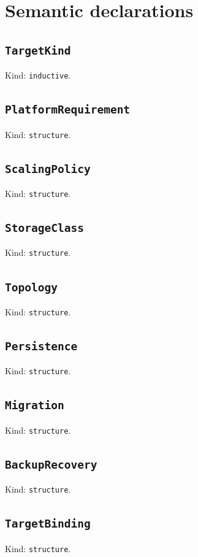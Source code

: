 \documentclass[11pt]{article}
\begin{document}
\section*{Semantic declarations}
\subsection*{\texttt{TargetKind}}
\noindent Kind: \texttt{inductive}.\par
\subsection*{\texttt{PlatformRequirement}}
\noindent Kind: \texttt{structure}.\par
\subsection*{\texttt{ScalingPolicy}}
\noindent Kind: \texttt{structure}.\par
\subsection*{\texttt{StorageClass}}
\noindent Kind: \texttt{structure}.\par
\subsection*{\texttt{Topology}}
\noindent Kind: \texttt{structure}.\par
\subsection*{\texttt{Persistence}}
\noindent Kind: \texttt{structure}.\par
\subsection*{\texttt{Migration}}
\noindent Kind: \texttt{structure}.\par
\subsection*{\texttt{BackupRecovery}}
\noindent Kind: \texttt{structure}.\par
\subsection*{\texttt{TargetBinding}}
\noindent Kind: \texttt{structure}.\par
\end{document}
